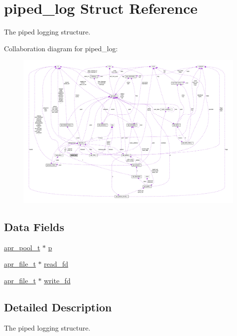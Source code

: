 \hypertarget{structpiped__log}{}\section{piped\+\_\+log Struct Reference}
\label{structpiped__log}


The piped logging structure.  




Collaboration diagram for piped\+\_\+log\+:
\nopagebreak
\begin{figure}[H]
\begin{center}
\leavevmode
\includegraphics[width=350pt]{structpiped__log__coll__graph}
\end{center}
\end{figure}
\subsection*{Data Fields}
\begin{DoxyCompactItemize}
\item 
\hyperlink{structapr__pool__t}{apr\+\_\+pool\+\_\+t} $\ast$ \hyperlink{structpiped__log_a9435653f8fa72502a33f80b49a779921}{p}
\item 
\hyperlink{structapr__file__t}{apr\+\_\+file\+\_\+t} $\ast$ \hyperlink{structpiped__log_aa193ff18ec135bf198fb611a1d93e049}{read\+\_\+fd}
\item 
\hyperlink{structapr__file__t}{apr\+\_\+file\+\_\+t} $\ast$ \hyperlink{structpiped__log_a1c3a44a4343ad621d424d28f3ae31a4a}{write\+\_\+fd}
\end{DoxyCompactItemize}


\subsection{Detailed Description}
The piped logging structure. 

